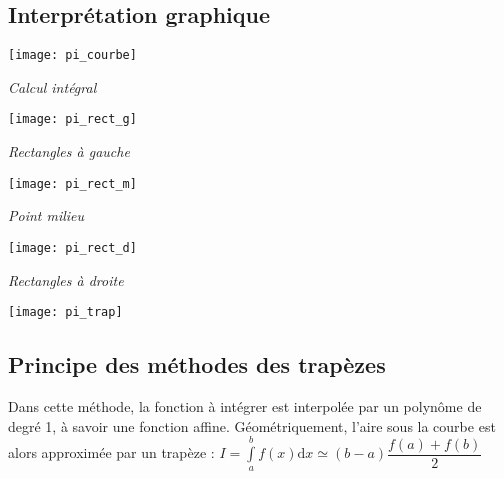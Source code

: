 \subsection{Interprétation graphique}

\begin{figure*}[!h]
\begin{minipage}[c]{.24\linewidth}
\begin{center}
\texttt{[image: pi\_courbe]}

\textit{Calcul intégral}
\end{center}
\end{minipage}\hfill
\begin{minipage}[c]{.24\linewidth}
\begin{center}
\texttt{[image: pi\_rect\_g]}

\textit{Rectangles à gauche}
\end{center}
\end{minipage}\hfill
\begin{minipage}[c]{.24\linewidth}
\begin{center}
\texttt{[image: pi\_rect\_m]}

\textit{Point milieu}
\end{center}
\end{minipage}\hfill
\begin{minipage}[c]{.24\linewidth}
\begin{center}
\texttt{[image: pi\_rect\_d]}

\textit{Rectangles à droite}
\end{center}
\end{minipage}
\end{figure*}

\begin{marginfigure}
\texttt{[image: pi\_trap]}
\end{marginfigure}

\subsection{Principe des méthodes des trapèzes}


\begin{defi}
Dans cette méthode, la fonction à intégrer est interpolée par un polynôme de degré 1, à savoir une fonction affine. Géométriquement, l'aire sous la courbe est alors approximée par un trapèze :
$I = \int\limits_a^{b} f(x) \mathrm{d}x \simeq \left(b-a\right) \dfrac{f(a)+f(b)}{2} $
\end{defi}


